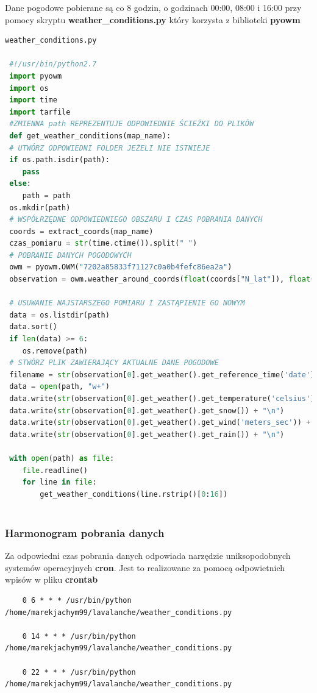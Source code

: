 Dane pogodowe pobierane są co 8 godzin, o godzinach 00:00, 08:00 i 16:00 przy pomocy skryptu \textbf{weather\_conditions.py} który korzysta z biblioteki \textbf{pyowm}
\begin{lstlisting}[language=Python]
 weather_conditions.py
 
 #!/usr/bin/python2.7
 import pyowm
 import os
 import time
 import tarfile
 #ZMIENNA path REPREZENTUJE ODPOWIEDNIE ŚCIEŻKI DO PLIKÓW
 def get_weather_conditions(map_name):
 # UTWÓRZ ODPOWIEDNI FOLDER JEŻELI NIE ISTNIEJE
 if os.path.isdir(path):
 	pass
 else:
 	path = path
 os.mkdir(path)
 # WSPÓŁRZĘDNE ODPOWIEDNIEGO OBSZARU I CZAS POBRANIA DANYCH
 coords = extract_coords(map_name)
 czas_pomiaru = str(time.ctime()).split(" ")
 # POBRANIE DANYCH POGODOWYCH
 owm = pyowm.OWM("7202a85833f71127c0a0b4fefc86ea2a")
 observation = owm.weather_around_coords(float(coords["N_lat"]), float(coords["W_long"]))
 
 # USUWANIE NAJSTARSZEGO POMIARU I ZASTĄPIENIE GO NOWYM
 data = os.listdir(path)
 data.sort()
 if len(data) >= 6:
 	os.remove(path)
 # STWÓRZ PLIK ZAWIERAJĄCY AKTUALNE DANE POGODOWE
 filename = str(observation[0].get_weather().get_reference_time('date'))[0:10]
 data = open(path, "w+")
 data.write(str(observation[0].get_weather().get_temperature('celsius')['temp']) + "\n")
 data.write(str(observation[0].get_weather().get_snow()) + "\n")
 data.write(str(observation[0].get_weather().get_wind('meters_sec')) + "\n")
 data.write(str(observation[0].get_weather().get_rain()) + "\n")
 
 with open(path) as file:
 	file.readline()
 	for line in file:
 		get_weather_conditions(line.rstrip()[0:16])
 
\end{lstlisting}
\clearpage
\subsubsection{Harmonogram pobrania danych}
Za odpowiedni czas pobrania danych odpowiada narzędzie uniksopodobnych systemów operacyjnych \textbf{cron}. Jest to realizowane za pomocą odpowietnich wpisów w pliku \textbf{crontab}
\begin{verbatim}
	0 6 * * * /usr/bin/python /home/marekjachym99/lavalanche/weather_conditions.py

	0 14 * * * /usr/bin/python /home/marekjachym99/lavalanche/weather_conditions.py
	
	0 22 * * * /usr/bin/python /home/marekjachym99/lavalanche/weather_conditions.py	
\end{verbatim}


